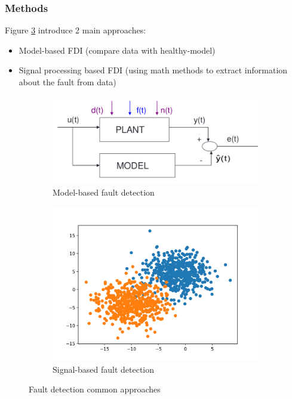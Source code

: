 \documentclass[class=article, crop=false]{standalone}
\begin{document}

\subsubsection{Methods}
Figure \ref{fig:fault_detection} introduce 2 main approaches:

\begin{itemize}
\item{Model-based FDI (compare data with healthy-model)}
\item{Signal processing based FDI (using math methods to extract information
    about the fault from data)}
\end{itemize}

\begin{figure}[h]
    \centering
\begin{subfigure}{0.5\textwidth}
    \includegraphics[width=0.9\linewidth]{model_based.png}
    \caption{Model-based fault detection}
    \label{fig:model_based}
\end{subfigure}%
\begin{subfigure}{0.5\textwidth}
    \includegraphics[width=0.9\linewidth]{signal_based.png}
    \caption{Signal-based fault detection}
    \label{fig:signal_based}
\end{subfigure}
\caption{Fault detection common approaches}
\label{fig:fault_detection}
\end{figure}
\end{document}
